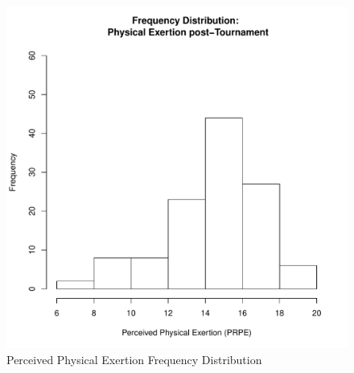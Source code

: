 \documentclass[12pt]{report}
\begin{document}
{\begin{figure}[htbp]
  \includegraphics[scale =.4]{../images/distPrpePost.pdf}
  \caption{Perceived Physical Exertion Frequency Distribution}
  \label{fig:prpeDist}
\end{figure}




}
\end{document}
